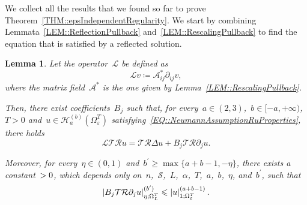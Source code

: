 \documentclass[12pt,a4paper]{amsart}
\makeatletter
\numberwithin{equation}{section}
\newtheorem{lemma}[theorem]{Lemma}
\theoremstyle{definition}
\theoremstyle{remark}
\newcommand{\eps}{\varepsilon}
\newcommand{\abs}[1]{\left\lvert#1\right\rvert}
\renewcommand{\leq}{\leqslant}
\renewcommand{\geq}{\geqslant}
\newcommand{\const}[1]{%
  \csname const@#1\endcsname%
}
\makeatother
\begin{document}
We collect all the results that we found so far to prove Theorem~\ref{THM::epsIndependentRegularity}. We start by combining Lemmata~\ref{LEM::ReflectionPullback} and~\ref{LEM::RescalingPullback} to find the equation that is satisfied by a reflected solution.

\begin{lemma}
    Let the operator~$\mathcal{L}$ be defined as
    \begin{equation}\label{EQ::LoperatorDefinition}
        \mathcal{L}v \coloneq \mathcal{A}_{ij}^\ast\partial_{ij}v,
    \end{equation}
    where the matrix field~$\mathcal{A}^\ast$ is the one given by Lemma~\ref{LEM::RescalingPullback}.

    Then, there exist coefficients~$B_j$ such that, for every~$a\in(2,3)$,~$b\in [-a,+\infty)$,~$T>0$ and~$u \in \mathcal{H}_a^{(b)}(\Omega_\eps^T)$ satisfying~\eqref{EQ::NeumannAssumptionRuProperties}, there holds %
    \begin{equation}\label{EQ::LTRExpression}
        \mathcal{L}\mathcal{T}\mathcal{R}u = \mathcal{T}\mathcal{R}\Delta u + B_j \mathcal{T}\mathcal{R}\partial_j u.
    \end{equation}
    
    Moreover, for every~$\eta\in (0,1)$ and~$b^\prime \geq \max\{a+b-1, -\eta\}$, there exists a constant~$\const{CONST::BjTRdjuHolder} > 0$, which depends only on~$n$,~$\mathcal{S}$,~$L$,~$\alpha$,~$T$,~$a$,~$b$,~$\eta$, and~$b^\prime$, such that 
    \begin{equation}\label{EQ::BjTRdjuHolder}
        \abs{B_j \mathcal{T}\mathcal{R}\partial_j u}_{\eta;\Omega_L^T}^{(b^\prime)} \leq \const{CONST::BjTRdjuHolder} \abs{u}_{1;\Omega_\eps^T}^{(a+b-1)}.
    \end{equation}
\end{lemma}
\end{document}
